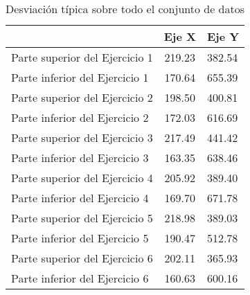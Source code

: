 \begin{table}[H]
\centering
\begin{tabular}{lcl}
\hline
\rowcolor[HTML]{EFEFEF} 
\multicolumn{1}{c}{\cellcolor[HTML]{EFEFEF}\textbf{Ejercicio realizado}} & \multicolumn{1}{l}{\cellcolor[HTML]{EFEFEF}\textbf{Eje X}} & \textbf{Eje Y}  \\ \hline
\rowcolor[HTML]{ECF4FF} 
Parte superior del Ejercicio 1                                           & 219.23                                                     & 382.54 \\
\rowcolor[HTML]{EFEFEF} 
Parte inferior del Ejercicio 1                                           & 170.64                                                     & 655.39 \\
\rowcolor[HTML]{ECF4FF} 
Parte superior del Ejercicio 2                                           & 198.50                                                     & 400.81 \\
\rowcolor[HTML]{EFEFEF} 
Parte inferior del Ejercicio 2                                           & 172.03                                                     & 616.69 \\
\rowcolor[HTML]{ECF4FF} 
Parte superior del Ejercicio 3                                           & 217.49                                                     & 441.42 \\
\rowcolor[HTML]{EFEFEF} 
Parte inferior del Ejercicio 3                                           & 163.35                                                     & 638.46 \\
\rowcolor[HTML]{ECF4FF} 
Parte superior del Ejercicio 4                                           & 205.92                                                     & 389.40 \\
\rowcolor[HTML]{EFEFEF} 
Parte inferior del Ejercicio 4                                           & 169.70                                                     & 671.78 \\
\rowcolor[HTML]{ECF4FF} 
Parte superior del Ejercicio 5                                           & 218.98                                                     & 389.03 \\
\rowcolor[HTML]{EFEFEF} 
Parte inferior del Ejercicio 5                                           & 190.47                                                     & 512.78 \\
\rowcolor[HTML]{ECF4FF} 
Parte superior del Ejercicio 6                                           & 202.11                                                     & 365.93 \\
\rowcolor[HTML]{EFEFEF} 
Parte inferior del Ejercicio 6                                           & 160.63                                                     & 600.16 \\ \hline
\end{tabular}
\caption{Desviación típica sobre todo el conjunto de datos}
\label{tab:ClasificacionEj4}
\end{table}

